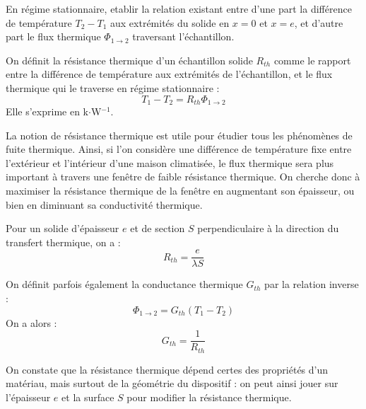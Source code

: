 \documentclass[11pt,fleqn]{book} %
\begin{document}
\begin{capex}
	En régime stationnaire, etablir la relation existant entre d'une part la différence de température $T_2 - T_1$ aux extrémités du solide en $x=0$ et $x=e$, et d'autre part le flux thermique $\Phi_{1 \to 2}$ traversant l'échantillon.
\end{capex}

\begin{definition}
	On définit la résistance thermique d'un échantillon solide $R_{th}$ comme le rapport entre la différence de température aux extrémités de l'échantillon, et le flux thermique qui le traverse en régime stationnaire :
	\begin{equation}
		T_1 - T_2 = R_{th} \Phi_{1 \to 2}
	\end{equation}
	Elle s'exprime en k$\cdot$W$^{-1}$.
\end{definition}

La notion de résistance thermique est utile pour étudier tous les phénomènes de fuite thermique. Ainsi, si l'on considère une différence de température fixe entre l'extérieur et l'intérieur d'une maison climatisée, le flux thermique sera plus important à travers une fenêtre de faible résistance thermique. On cherche donc à maximiser la résistance thermique de la fenêtre en augmentant son épaisseur, ou bien en diminuant sa conductivité thermique.

\begin{proposition}
	Pour un solide d'épaisseur $e$ et de section $S$ perpendiculaire à la direction du transfert thermique, on a :
	\begin{equation}
		R_{th} = \frac{e}{\lambda S}
	\end{equation}
\end{proposition}

\begin{remark}
	On définit parfois également la conductance thermique $G_{th}$ par la relation inverse :
	\begin{equation}
		\Phi_{1 \to 2} = G_{th} (T_1 - T_2)
	\end{equation}
	On a alors :
	\begin{equation}
		G_{th} = \frac{1}{R_{th}}
	\end{equation}
\end{remark}

On constate que la résistance thermique dépend certes des propriétés d'un matériau, mais surtout de la géométrie du dispositif : on peut ainsi jouer sur l'épaisseur $e$ et la surface $S$ pour modifier la résistance thermique.
\end{document}
